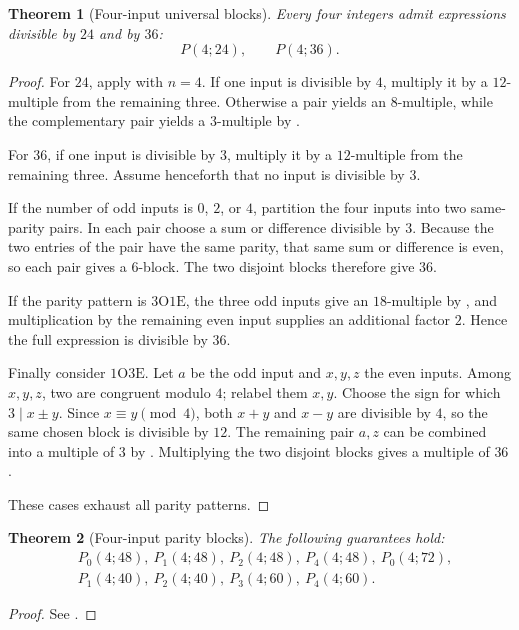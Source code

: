 \documentclass[11pt]{amsart}
\newtheorem{theorem}{Theorem}[section]
\theoremstyle{definition}
\theoremstyle{remark}
\newcommand{\OO}{\mathrm O}
\newcommand{\EE}{\mathrm E}
\begin{document}
\begin{theorem}[Four-input universal blocks]\label{thm:fourblocks}
Every four integers admit expressions divisible by $24$ and by $36$:
\[
 P(4;24),\qquad P(4;36).
\]
\end{theorem}
\begin{proof}
For $24$, apply  with $n=4$.  If one input is divisible
by $4$, multiply it by a $12$-multiple from the remaining three.  Otherwise
a pair yields an $8$-multiple, while the complementary pair yields a
$3$-multiple by .

For $36$, if one input is divisible by $3$, multiply it by a $12$-multiple
from the remaining three.  Assume henceforth that no input is divisible by
$3$.

If the number of odd inputs is $0$, $2$, or $4$, partition the four inputs
into two same-parity pairs.  In each pair choose a sum or difference divisible
by $3$.  Because the two entries of the pair have the same parity, that same
sum or difference is even, so each pair gives a $6$-block.  The two disjoint
blocks therefore give $36$.

If the parity pattern is $3\OO1\EE$, the three odd inputs give an
$18$-multiple by , and multiplication by the remaining
even input supplies an additional factor $2$.  Hence the full expression is
divisible by $36$.

Finally consider $1\OO3\EE$.  Let $a$ be the odd input and $x,y,z$ the
even inputs.  Among $x,y,z$, two are congruent modulo $4$; relabel them
$x,y$.  Choose the sign for which $3\mid x\pm y$.  Since
$x\equiv y\pmod4$, both $x+y$ and $x-y$ are divisible by $4$, so the same
chosen block is divisible by $12$.  The remaining pair $a,z$ can be combined
into a multiple of $3$ by .  Multiplying the two disjoint
blocks gives a multiple of $36$.

These cases exhaust all parity patterns.
\end{proof}

\begin{theorem}[Four-input parity blocks]\label{thm:fourparity}
The following guarantees hold:
\[
\begin{aligned}
 &P_0(4;48),\ P_1(4;48),\ P_2(4;48),\ P_4(4;48),\ P_0(4;72),\\
 &P_1(4;40),\ P_2(4;40),\ P_3(4;60),\ P_4(4;60).
\end{aligned}
\]
\end{theorem}
\begin{proof}
See .
\end{proof}
\end{document}
